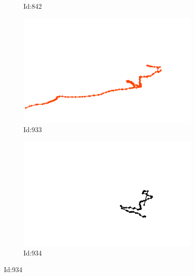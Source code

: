 \documentclass[12pt,twoside]{report}
\begin{document}
\begin{figure}
\begin{subfigure}[b]{0.20\textwidth}
\caption{Id:842}
\end{subfigure}
\begin{subfigure}[b]{0.20\textwidth}
\centering
\includegraphics[width=\textwidth]{../trajectories/933.png}
\caption{Id:933}
\end{subfigure}
\begin{subfigure}[b]{0.20\textwidth}
\centering
\includegraphics[width=\textwidth]{../trajectories/934.png}
\caption{Id:934}
\end{subfigure}
\end{figure}
\begin{figure}
\end{figure}
\end{document}
